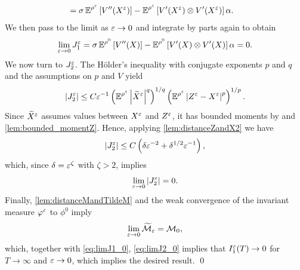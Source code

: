 \documentclass[review,onefignum,onetabnum]{siamonline190516}
\begin{document}
\begin{appendices}
\begin{equation}
\begin{aligned}
	&= \sigma \operatorname{\mathbb{E}}^{\rho^\varepsilon} \left[ V''(X^\varepsilon) \right] - \operatorname{\mathbb{E}}^{\rho^\varepsilon} \left[ V'(X^\varepsilon) \otimes V'(X^\varepsilon) \right] \alpha.
	\end{aligned}
	\end{equation}
	We then pass to the limit as $\varepsilon \to 0$ and integrate by parts again to obtain
	\begin{equation} \label{eq:limJ1_0}
	\lim_{\epl\to 0} J_1^\epl = \sigma \E^{\rho^0} \left[ V''(X) \right] - \E^{\rho^0} \left[ V'(X) \otimes V'(X) \right] \alpha = 0.
	\end{equation}
	We now turn to $J_2^\varepsilon$. The Hölder's inequality with conjugate exponents $p$ and $q$ and the assumptions on $p$ and $V$ yield
	\begin{equation}
	\left\lvert J_2^\varepsilon\right\rvert \le C \varepsilon^{-1} \left( \operatorname{\mathbb{E}}^{\rho^\varepsilon} \left\lvert\widetilde X^\varepsilon\right\rvert^q \right)^{1/q} \left( \operatorname{\mathbb{E}}^{\rho^\varepsilon} \left\lvert Z^\varepsilon - X^\varepsilon\right\rvert^p \right)^{1/p}.
	\end{equation}
	Since $\widetilde X^\varepsilon$ assumes values between $X^\varepsilon$ and $Z^\varepsilon$, it has bounded moments by \cite[Corollary 5.4]{PaS07} and \cref{lem:bounded_momentZ}. Hence, applying \cref{lem:distanceZandX2} we have
	\begin{equation} 
	\left\lvert J_2^\varepsilon\right\rvert \le C \left( \delta \varepsilon^{-2} + \delta^{1/2} \varepsilon^{-1} \right),
	\end{equation}
	which, since $\delta = \varepsilon^\zeta$ with $\zeta > 2$, implies
	\begin{equation}\label{eq:limJ2_0}
		\lim_{\epl \to 0} \abs{J_2^\epl} = 0.
	\end{equation}
	Finally, \cref{lem:distanceMandTildeM} and the weak convergence of the invariant measure $\varphi^\varepsilon$ to $\phi^0$ imply
	\begin{equation}
	\lim_{\varepsilon \to 0} \widetilde{\mathcal M}_\varepsilon = \mathcal M_0,
	\end{equation}
	which, together with \eqref{eq:limJ1_0}, \eqref{eq:limJ2_0} implies that $I_1^\varepsilon(T) \to 0$ for $T \to \infty$ and $\varepsilon \to 0$, which implies the desired result. \qed

\end{appendices}




\end{document}
